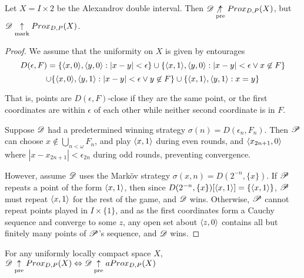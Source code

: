 \newpage

\begin{example}
  Let $X=I\times 2$ be the Alexandrov double interval. Then 
  $\mathscr{D} \not\underset{\text{pre}}{\uparrow} Prox_{D,P}(X)$, but $\mathscr{D} \underset{\text{mark}}{\uparrow} Prox_{D,P}(X)$.
\end{example}

\begin{proof}
  We assume that the uniformity on $X$ is given by entourages 
  \[
    D(\epsilon,F) = 
    \{\langle x,0\rangle,\langle y,0\rangle: |x-y|<\epsilon \}
      \cup
    \{\langle x,1\rangle,\langle y,0\rangle: |x-y|<\epsilon \vee x\not\in F\}
  \]
  \[
      \cup
    \{\langle x,0\rangle,\langle y,1\rangle: |x-y|<\epsilon \vee y\not\in F\}
      \cup
    \{\langle x,1\rangle,\langle y,1\rangle: x=y\}
  \]

  That is, points are $D(\epsilon,F)$-close if they are the same point, or 
  the first coordinates are within $\epsilon$ of each other while neither 
  second coordinate is in $F$.

  Suppose $\mathscr{D}$ had a predetermined winning strategy 
  $\sigma(n)=D(\epsilon_n,F_n)$. Then 
  $\mathscr{P}$ can choose $x\not\in \bigcup_{n<\omega} F_n$, and play $\langle x,1\rangle$ 
  during even rounds, and $\langle x_{2n+1},0\rangle$ where $|x-x_{2n+1}|<\epsilon_{2n}$
  during odd rounds, preventing convergence.

  However, assume $\mathscr{D}$ uses the Mark\"ov strategy 
  $\sigma(x,n)=D(2^{-n},\{x\})$.
  If $\mathscr{P}$ repeats a point of the form $\langle x,1\rangle$, then since 
  $D(2^{-n},\{x\})[\langle x,1\rangle]=\{\langle x,1\rangle\}$, $\mathscr{P}$ must repeat $\langle x,1\rangle$ for
  the rest of the game, and $\mathscr{D}$ wins. Otherwise, $\mathscr{P}$ cannot repeat 
  points played in $I\times\{1\}$, and as the first
  coordinates form a Cauchy sequence and converge to some $z$, any open set
  about $\langle z,0\rangle$ contains all but finitely many points of $\mathscr{P}$'s sequence,
  and $\mathscr{D}$ wins.
\end{proof}

\begin{theorem}
  For any uniformly locally compact space $X$,
      $\mathscr{D}\underset{\text{pre}}{\uparrow} Prox_{D,P}(X) \Leftrightarrow \mathscr{D}\underset{\text{pre}}{\uparrow} aProx_{D,P}(X)$
\end{theorem}


